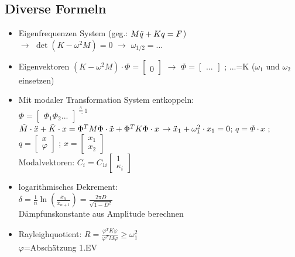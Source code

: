 \documentclass[fleqn,twoside]{article}
\begin{document}
\begin{multicols*}{3}
\section{Diverse Formeln}
\begin{itemize}
    \item Eigenfrequenzen System (geg.: $M\Ddot{q}+Kq=F$) \\ $\rightarrow$ $\det(K-\omega^2M)=0$ $\rightarrow$ $\omega_{1/2}=...$
    \item Eigenvektoren $(K-\omega^2M)\cdot\Phi=\begin{bmatrix}{0}\\{0}\end{bmatrix}$ $\rightarrow$ $\Phi=\begin{bmatrix}{1}\\{...}\end{bmatrix}$ ; ...=K ($\omega_1$ und $\omega_2$ einsetzen)
    \item Mit modaler Transformation System entkoppeln: \\ $\Phi=\begin{bmatrix}{\Phi_1}{\Phi_2}{...}\end{bmatrix} ^{\underline{\overset{\wedge}{=}1}}$\\
     $\tilde{M} \cdot \Ddot{x}+\tilde{K}\cdot x = \Phi^TM\Phi \cdot \Ddot{x} + \Phi^T K \Phi \cdot x$ $\rightarrow \Ddot{x}_1 + \omega^2_1 \cdot x_1=0$; $q=\Phi\cdot x$ ; $q=\begin{bmatrix} {x}\\{\varphi} \end{bmatrix}$ ; $x=\begin{bmatrix}{x_1}\\{x_2}\end{bmatrix}$ \\
     Modalvektoren: $C_i = C_{1i} \begin{bmatrix} {1}\\{\kappa_i} \end{bmatrix}$

     \item logarithmisches Dekrement: \\
     $\delta=\frac{1}{n}\ln{\left( \frac{x_n}{x_{n+1}}\right)}=\frac{2\pi D}{\sqrt{1-D^2}}$\\Dämpfunskonstante aus Amplitude berechnen

     \item Rayleighquotient: $R=\frac{\varphi^T K \varphi}{\varphi^T M \varphi} \geq \omega_1^2$\\
     $\varphi$=Abschätzung 1.EV


\end{itemize}
\end{multicols*}
\end{document}
